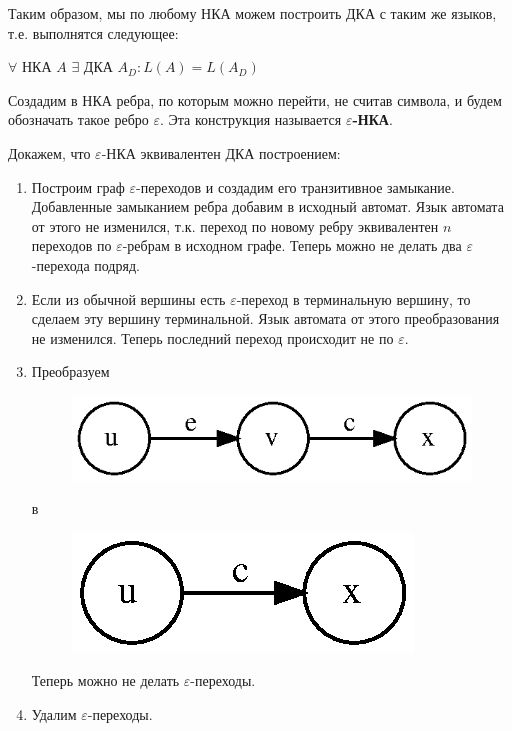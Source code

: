 Таким образом, мы по любому НКА можем построить ДКА с таким же языков, т.е. выполнятся следующее:
\begin{theorem}
    $\forall$ НКА $A$ $\exists$ ДКА $A_D : L(A) = L(A_D)$
\end{theorem}

Создадим в НКА ребра, по которым можно перейти, не считав символа, и будем обозначать такое ребро $\varepsilon$. Эта конструкция называется \textbf{$\varepsilon$-НКА}.

Докажем, что $\varepsilon$-НКА эквивалентен ДКА построением:

\begin{enumerate}
    \item Построим граф $\varepsilon$-переходов и создадим его транзитивное замыкание. Добавленные замыканием ребра добавим в исходный автомат. Язык автомата от этого не изменился, т.к. переход по новому ребру эквивалентен $n$ переходов по $\varepsilon$-ребрам в исходном графе. Теперь можно не делать два $\varepsilon$-перехода подряд.
    \item Если из обычной вершины есть $\varepsilon$-переход в терминальную вершину, то сделаем эту вершину терминальной. Язык автомата от этого преобразования не изменился. Теперь последний переход происходит не по $\varepsilon$.
    
    \pagebreak
    
    \item Преобразуем \begin{figure}[h]
        \includegraphics{graphs/8.3.dot.eps}
    \end{figure}
    
    в
    
    \begin{figure}[h]
        \includegraphics{graphs/8.4.dot.eps}
    \end{figure}

    Теперь можно не делать $\varepsilon$-переходы.

    \item Удалим $\varepsilon$-переходы.
\end{enumerate}

